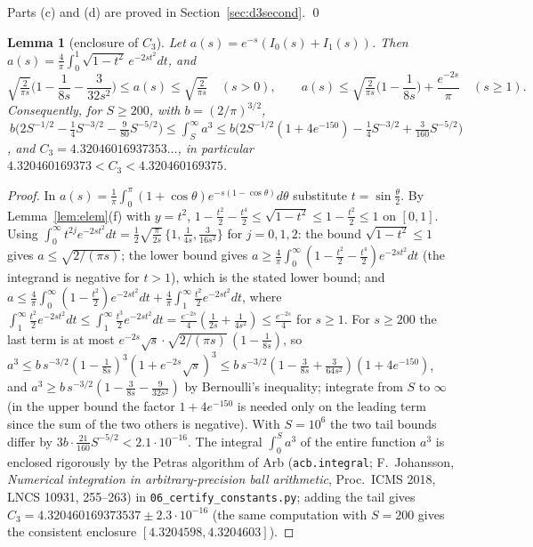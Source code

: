 \documentclass[11pt,a4paper]{article}
\theoremstyle{plain}
\newtheorem{lemma}[theorem]{Lemma}
\theoremstyle{definition}
\numberwithin{equation}{section}
\begin{document}
Parts (c) and (d) are proved in Section~\ref{sec:d3second}. \qed

\begin{lemma}[enclosure of $C_3$]\label{lem:C3}
Let $a(s)=e^{-s}(I_0(s)+I_1(s))$. Then $a(s)=\frac4\pi\int_0^1\sqrt{1-t^2}\,e^{-2st^2}dt$, and
\[
\sqrt{\tfrac{2}{\pi s}}\Big(1-\frac{1}{8s}-\frac{3}{32s^2}\Big)\le a(s)\le\sqrt{\tfrac2{\pi s}}\quad(s>0),\qquad a(s)\le\sqrt{\tfrac{2}{\pi s}}\Big(1-\frac1{8s}\Big)+\frac{e^{-2s}}{\pi}\quad(s\ge1).
\]
Consequently, for $S\ge200$, with $b=(2/\pi)^{3/2}$,
$\ b\big(2S^{-1/2}-\frac14S^{-3/2}-\frac9{80}S^{-5/2}\big)\le\int_S^\infty a^3\le b\big(2S^{-1/2}(1+4e^{-150})-\frac14S^{-3/2}+\frac{3}{160}S^{-5/2}\big)$, and $C_3=4.32046016937353\ldots$, in particular $4.320460169373<C_3<4.320460169375$.
\end{lemma}
\begin{proof}
In $a(s)=\frac1\pi\int_0^\pi(1+\cos\theta)e^{-s(1-\cos\theta)}d\theta$ substitute $t=\sin\frac\theta2$. By Lemma~\ref{lem:elem}(f) with $y=t^2$, $1-\frac{t^2}2-\frac{t^4}2\le\sqrt{1-t^2}\le1-\frac{t^2}2\le1$ on $[0,1]$. Using $\int_0^\infty t^{2j}e^{-2st^2}dt=\frac12\sqrt{\frac{\pi}{2s}}\,\{1,\frac1{4s},\frac{3}{16s^2}\}$ for $j=0,1,2$:
the bound $\sqrt{1-t^2}\le1$ gives $a\le\sqrt{2/(\pi s)}$; the lower bound gives $a\ge\frac4\pi\int_0^\infty(1-\frac{t^2}2-\frac{t^4}{2})e^{-2st^2}dt$ (the integrand is negative for $t>1$), which is the stated lower bound; and $a\le\frac4\pi\int_0^\infty(1-\frac{t^2}{2})e^{-2st^2}dt+\frac4\pi\int_1^\infty\frac{t^2}2e^{-2st^2}dt$, where $\int_1^\infty\frac{t^2}{2}e^{-2st^2}dt\le\int_1^\infty\frac{t^3}2e^{-2st^2}dt=\frac{e^{-2s}}4(\frac1{2s}+\frac{1}{4s^2})\le\frac{e^{-2s}}{4}$ for $s\ge1$.
For $s\ge200$ the last term is at most $e^{-2s}\sqrt s\cdot\sqrt{2/(\pi s)}\,(1-\frac1{8s})$, so $a^3\le b\,s^{-3/2}(1-\frac1{8s})^3(1+e^{-2s}\sqrt s)^3\le b\,s^{-3/2}(1-\frac{3}{8s}+\frac{3}{64s^2})(1+4e^{-150})$, and $a^3\ge b\,s^{-3/2}(1-\frac{3}{8s}-\frac{9}{32s^2})$ by Bernoulli's inequality; integrate from $S$ to $\infty$ (in the upper bound the factor $1+4e^{-150}$ is needed only on the leading term since the sum of the two others is negative). With $S=10^6$ the two tail bounds differ by $3b\cdot\frac{21}{160}S^{-5/2}<2.1\cdot10^{-16}$. The integral $\int_0^{S}a^3$ of the entire function $a^3$ is enclosed rigorously by the Petras algorithm of Arb (\texttt{acb.integral}; F.~Johansson, \emph{Numerical integration in arbitrary-precision ball arithmetic}, Proc.\ ICMS 2018, LNCS 10931, 255--263) in \texttt{06\_certify\_constants.py}; adding the tail gives $C_3=4.320460169373537\pm2.3\cdot10^{-16}$ (the same computation with $S=200$ gives the consistent enclosure $[4.3204598,4.3204603]$).
\end{proof}
\end{document}
